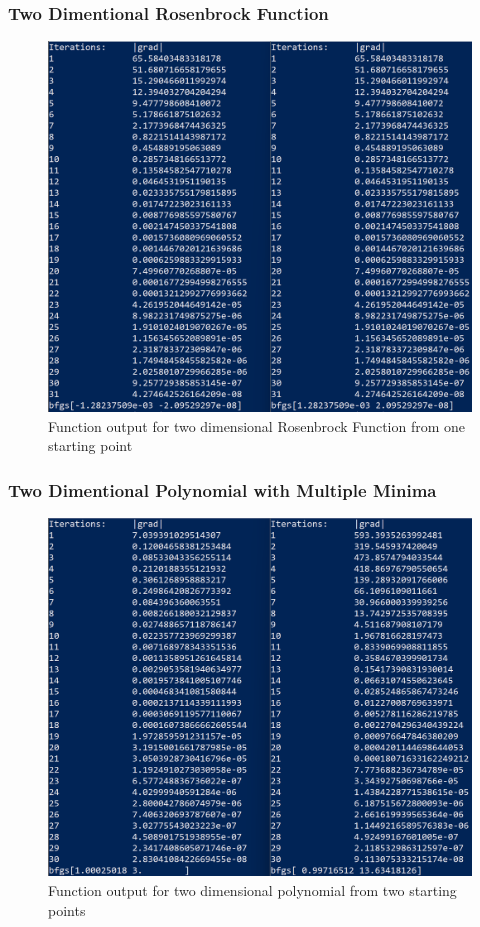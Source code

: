 \documentclass[11pt]{article}%
\begin{document}
\subsubsection{Two Dimentional Rosenbrock Function}
\label{sec:rosbrock}
\begin{figure}[!ht]
    \centering
   \includegraphics[width=0.75\linewidth]{d2.png}
    \caption{Function output for two dimensional Rosenbrock Function from one starting point}
    \label{fig:rosbrock}
\end{figure}
\newpage
\subsubsection{Two Dimentional Polynomial with Multiple Minima}
\label{sec:twodpolymult}
\begin{figure}[!ht]
    \centering
   \includegraphics[width=0.75\linewidth]{d2mult.png}
    \caption{Function output for two dimensional polynomial from two starting points}
    \label{fig:d2mult}
\end{figure}
\newpage
\end{document}
